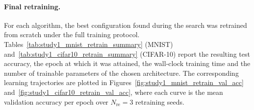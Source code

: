 \begin{table}[h!]
    \centering
    \caption{CIFAR-10: aggregated search results of the five candidate algorithms over $N_{\mathrm{val}} = 5$ independent repetitions of $220$ evaluations each. Values are reported as $\mathrm{mean} \pm \mathrm{std}$ unless otherwise stated.}
    \label{tab:study1_cifar10_comparison}
\end{table}

\paragraph{Final retraining.}
For each algorithm, the best configuration found during the search was retrained from scratch under the full training protocol. Tables~\ref{tab:study1_mnist_retrain_summary} (MNIST) and~\ref{tab:study1_cifar10_retrain_summary} (CIFAR-10) report the resulting test accuracy, the epoch at which it was attained, the wall-clock training time and the number of trainable parameters of the chosen architecture. The corresponding learning trajectories are plotted in Figures~\ref{fig:study1_mnist_retrain_val_acc} and~\ref{fig:study1_cifar10_retrain_val_acc}, where each curve is the mean validation accuracy per epoch over $N_{\mathrm{re}}=3$ retraining seeds.

